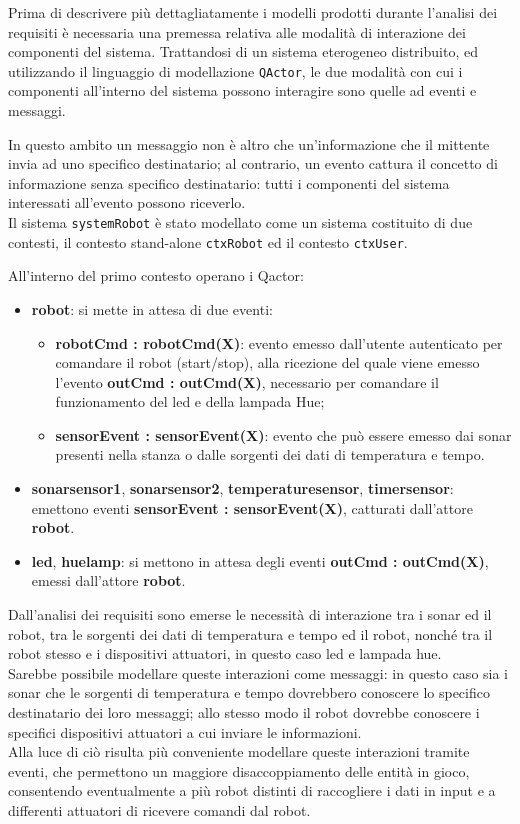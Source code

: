 \documentclass{llncs}
\newcommand{\action}[1]{\texttt{#1}\xspace}
\begin{document}
Prima di descrivere più dettagliatamente i modelli prodotti durante l'analisi dei requisiti è necessaria una premessa relativa alle modalità di interazione dei componenti del sistema. Trattandosi di un sistema eterogeneo distribuito, ed utilizzando il linguaggio di modellazione \action{QActor}, le due modalità con cui i componenti all'interno del sistema possono interagire sono quelle ad eventi e messaggi. 

In questo ambito un messaggio non è altro che un'informazione che il mittente invia ad uno specifico destinatario; al contrario, un evento cattura il concetto di informazione senza specifico destinatario: tutti i componenti del sistema interessati all'evento possono riceverlo. \\

Il sistema \action{systemRobot} è stato modellato come un sistema costituito di due contesti, il contesto stand-alone \action{ctxRobot} ed il contesto \action{ctxUser}. 

All'interno del primo contesto operano i Qactor:
\begin{itemize}
	\item \textbf{robot}: si mette in attesa di due eventi: 
	\begin{itemize}
		\item \textbf{robotCmd : robotCmd(X)}: evento emesso dall'utente autenticato per comandare il robot (start/stop), alla ricezione del quale viene emesso l'evento \textbf{outCmd : outCmd(X)}, necessario per comandare il funzionamento del led e della lampada Hue;
		\item \textbf{sensorEvent : sensorEvent(X)}: evento che può essere emesso dai sonar presenti nella stanza o dalle sorgenti dei dati di temperatura e tempo.
	\end{itemize}
	 \item \textbf{sonarsensor1}, \textbf{sonarsensor2}, \textbf{temperaturesensor}, \textbf{timersensor}: emettono eventi \textbf{sensorEvent : sensorEvent(X)}, catturati dall'attore \textbf{robot}.
	 \item \textbf{led}, \textbf{huelamp}: si mettono in attesa 
	 degli eventi \textbf{outCmd : outCmd(X)}, emessi dall'attore \textbf{robot}. 
\end{itemize}
Dall'analisi dei requisiti sono emerse le necessità di interazione tra i sonar ed il robot, tra le sorgenti dei dati di temperatura e tempo ed il robot, nonché tra il robot stesso e i dispositivi attuatori, in questo caso led e lampada hue. \\
Sarebbe possibile modellare queste interazioni come messaggi: in questo caso sia i sonar che le sorgenti di temperatura e tempo dovrebbero conoscere lo specifico destinatario dei loro messaggi; allo stesso modo il robot dovrebbe conoscere i specifici dispositivi attuatori a cui inviare le informazioni. \\
Alla luce di ciò risulta più conveniente modellare queste interazioni tramite eventi, che permettono un maggiore disaccoppiamento delle entità in gioco, consentendo eventualmente a più robot distinti di raccogliere i dati in input e a differenti attuatori di ricevere comandi dal robot. \\
\end{document}
